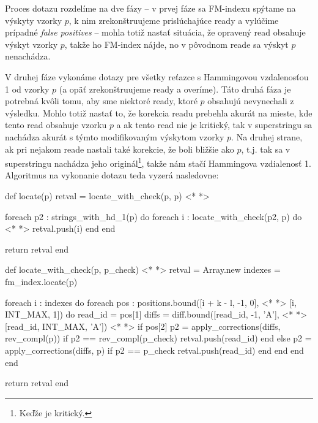 Proces dotazu rozdelíme na dve fázy -- v prvej fáze sa FM-indexu spýtame na výskyty vzorky $p$, k nim zrekonštruujeme prislúchajúce ready a vylúčime prípadné \emph{false positives} -- mohla totiž nastať situácia, že opravený read obsahuje výskyt vzorky $p$, takže ho FM-index nájde, no v pôvodnom reade sa výskyt $p$ nenachádza.

V druhej fáze vykonáme dotazy pre všetky reťazce s Hammingovou vzdalenosťou 1 od vzorky $p$ (a opäť zrekonštruujeme ready a overíme). Táto druhá fáza je potrebná kvôli tomu, aby sme niektoré ready, ktoré $p$ obsahujú nevynechali z výsledku. Mohlo totiž nastať to, že korekcia readu prebehla akurát na mieste, kde tento read obsahuje vzorku $p$ a ak tento read nie je kritický, tak v superstringu sa nachádza akurát s týmto modifikovaným výskytom vzorky $p$. Na druhej strane, ak pri nejakom reade nastali také korekcie, že boli bližšie ako $p$, t.j. tak sa v superstringu nachádza jeho originál\footnote{Keďže je kritický.}, takže nám stačí Hammingova vzdialenosť 1. Algoritmus na vykonanie dotazu teda vyzerá nasledovne:

\bigskip
\begin{pseudocode}[label=lst:cr_index_query2,caption={Algoritmus dotazu \emph{locate} CR-indexu nad readmi s chybami.}]
def locate(p) 
  retval = locate_with_check(p, p)  <* \label{lst:cr_index_query2_locate_with_check_call} *>  
  
  foreach p2 : strings_with_hd_1(p) do
    foreach i : locate_with_check(p2, p) do <* \label{lst:cr_index_query2_locate_with_check_call2} *> 
      retval.push(i)
    end
  end
  
  return retval
end

def locate_with_check(p, p_check) <* \label{lst:cr_index_query2_locate_with_check} *>  
  retval = Array.new
  indexes = fm_index.locate(p)
  
  foreach i : indexes do
    foreach pos : positions.bound([i + k - l, -1, 0],  <* \label{lst:cr_index_query2_bound} *>  
                                  [i, INT_MAX, 1]) do
      read_id = pos[1]
      diffs = diff.bound([read_id, -1, 'A'], <* \label{lst:cr_index_query2_bound2} *>  
                         [read_id, INT_MAX, 'A']) <* \label{lst:cr_index_query2_bound3} *>  
      if pos[2]
        p2 = apply_corrections(diffs, rev_compl(p))
        if p2 == rev_compl(p_check)
          retval.push(read_id)
        end
      else
        p2 = apply_corrections(diffs, p)
        if p2 == p_check
          retval.push(read_id)
        end
      end
    end
  end
  
  return retval
end
\end{pseudocode}
\bigskip

